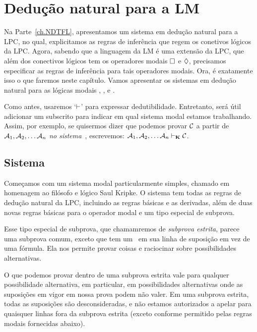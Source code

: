 \chapter{Dedução natural para a LM}
\label{Proof}

Na Parte~\ref{ch.NDTFL},  apresentamos um sistema em dedução natural para a LPC, no qual, explicitamos as regras de inferência que regem os conetivos lógicos da  LPC.  Agora, sabendo que a linguagem da LM é uma extensão da LPC,  que além dos conectivos lógicos tem os operadores modais   $\Box$ e $\Diamond$,  precisamos especificar as regras de inferência para tais operadores modais. Ora, é exatamente isso o que faremos neste capítulo. Vamos apresentar os sistemas em dedução  natural  para as lógicas modais  \mlK, \mlT, \mlSfour{} e \mlSfive.

Como  antes,  usaremos `$\vdash$' para expressar dedutibilidade. Entretanto, será útil adicionar um subscrito para indicar em qual sistema modal estamos trabalhando. Assim,  por exemplo, se quisermos dizer que podemos provar $\mathcal{C}$ a partir de $\mathcal{A}_1,\mathcal{A}_2, \dots \mathcal{A}_n$ \emph{no sistema}~\mlK, escrevemos: $\mathcal{A}_1,\mathcal{A}_2, \dots \mathcal{A}_n \vdash_{\mathbf{K}} \mathcal{C}$.

\section{Sistema \mlK}
\label{K}

Começamos com um sistema modal particularmente simples, chamado \mlK{} em homenagem ao filósofo e lógico Saul Kripke. O sistema \mlK{} tem todas as regras de dedução natural da  LPC, incluindo as regras  básicas e as derivadas, além de  duas novas regras básicas para o operador modal   \ebox{}  e um tipo especial de subprova.   

Esse  tipo especial de subprova, que chamamremos de  \emph{subprova estrita}, parece uma subprova comum, exceto que tem um~\ebox{} em sua linha de suposição em vez de uma fórmula. Ela nos permite provar coisas e raciocinar sobre possibilidades alternativas. 
 
 O que podemos provar dentro de uma subprova estrita vale para qualquer possibilidade alternativa, em particular, em possibilidades alternativas onde as suposições em vigor em nossa prova podem não valer. Em uma subprova estrita, todas as suposições são desconsideradas, e não estamos autorizados a apelar para quaisquer linhas fora da subprova estrita (exceto conforme permitido pelas regras modais fornecidas abaixo).


